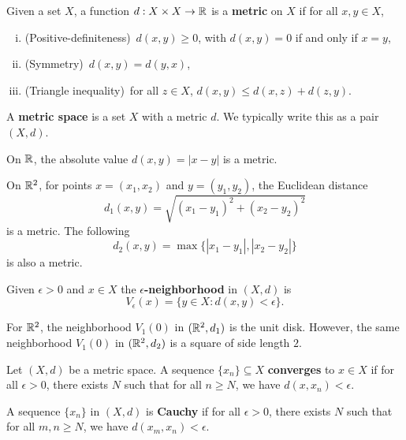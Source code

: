 \begin{definition}
  Given a set $X$, a function $d : X \times X \to \mathbb{R}$ is a
  \textbf{metric} on $X$ if for all $x, y \in X$,
  \begin{enumerate}[(i)]
    \item (Positive-definiteness)\ $d(x, y) \ge 0$, with $d(x, y) = 0$ if and only
      if $x = y$,
    \item (Symmetry)\ $d(x, y) = d(y, x)$,
    \item (Triangle inequality)\ for all $z \in X$,
      $d(x, y) \le d(x, z) + d(z, y)$.
  \end{enumerate}
  A \textbf{metric space} is a set $X$ with a metric $d$.
  We typically write this as a pair $(X, d)$.
\end{definition}

\begin{example}
  On $\mathbb{R}$, the absolute value $d(x, y) = |x - y|$ is a metric.
\end{example}

\begin{example}
  On $\mathbb{R}^2$, for points $x = (x_1, x_2)$ and $y = (y_1, y_2)$,
  the Euclidean distance
  \[d_1 (x, y) = \sqrt{(x_1 - y_1)^2 + (x_2 - y_2)^2}\]
  is a metric. The following
  \[
    d_2(x, y) = \max\{|x_1 - y_1|, |x_2 - y_2|\}
  \]
  is also a metric.
\end{example}

\begin{definition}
  Given $\epsilon > 0$ and $x \in X$ the
  \textbf{$\epsilon$-neighborhood} in $(X, d)$ is
  \[V_\epsilon(x) = \{y \in X : d(x, y) < \epsilon\}.\]
\end{definition}

\begin{example}
  For $\mathbb{R}^2$, the neighborhood
  $V_1(0)$ in $(\mathbb{R}^2, d_1)$ is the unit disk.
  However, the same
  neighborhood $V_1(0)$ in $(\mathbb{R}^2, d_2)$
  is a square of
  side length $2$.
\end{example}

\begin{definition}
  Let $(X, d)$ be a metric space. A sequence
  $\{x_n\} \subseteq X$ \textbf{converges} to
  $x \in X$ if for all
  $\epsilon > 0$, there exists $N$ such that for all
  $n \ge N$, we have $d(x, x_n) < \epsilon$.
\end{definition}

\begin{definition}
  A sequence $\{x_n\}$ in $(X, d)$ is \textbf{Cauchy} if
  for all $\epsilon > 0$, there exists $N$ such that
  for all $m, n \ge N$, we have $d(x_m, x_n) < \epsilon$.
\end{definition}

